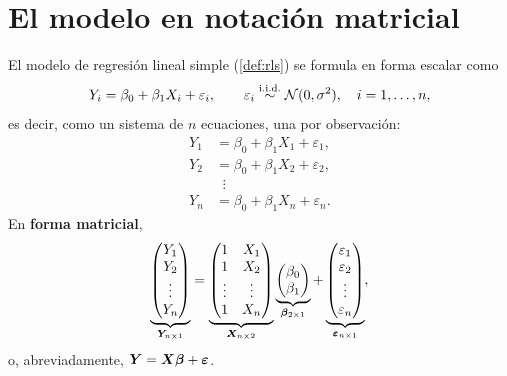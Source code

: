 \section{El modelo en notación matricial}
\label{sec:t5-modelo}

El modelo de regresión lineal simple (\cref{def:rls}) se formula en forma escalar como
\[
  Y_i = \beta_0+\beta_1X_i+\varepsilon_i, \qquad \varepsilon_i\overset{\text{i.i.d.}}{\sim}\mathcal{N}(0,\sigma^2), \quad i=1,\ldots,n,
\]
es decir, como un sistema de $n$ ecuaciones, una por observación:
\[
  \begin{aligned}
    Y_1 &= \beta_0+\beta_1X_1+\varepsilon_1, \\
    Y_2 &= \beta_0+\beta_1X_2+\varepsilon_2, \\
        &\;\;\vdots \\
    Y_n &= \beta_0+\beta_1X_n+\varepsilon_n .
  \end{aligned}
\]
En \textbf{forma matricial},
\[
  \underbrace{\begin{pmatrix} Y_1\\ Y_2\\ \vdots\\ Y_n \end{pmatrix}}_{\bm{Y}_{n\times1}}
  =
  \underbrace{\begin{pmatrix} 1 & X_1\\ 1 & X_2\\ \vdots & \vdots\\ 1 & X_n \end{pmatrix}}_{\bm{X}_{n\times2}}
  \underbrace{\begin{pmatrix} \beta_0\\ \beta_1 \end{pmatrix}}_{\bm{\beta}_{2\times1}}
  +
  \underbrace{\begin{pmatrix} \varepsilon_1\\ \varepsilon_2\\ \vdots\\ \varepsilon_n \end{pmatrix}}_{\bm{\varepsilon}_{n\times1}},
\]
o, abreviadamente, $\bm{Y}=\bm{X}\bm{\beta}+\bm{\varepsilon}$.

